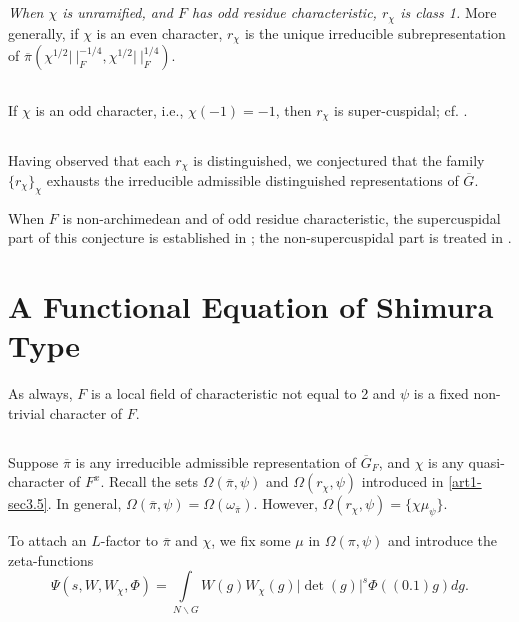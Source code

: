 \subsection{}\label{art1-sec4.3}
{\em When $\chi$ is unramified, and $F$ has odd residue characteristic, $r_{\chi}$ is class 1.} More generally, if $\chi$ is an even character, $r_{\chi}$ is the unique irreducible subrepresentation of $\overline{\pi}(\chi^{1/2}|~|^{-1/4}_{F},\chi^{1/2}|~|_{F}^{1/4})$.

\subsection{}\label{art1-sec4.4}\pageoriginale
If $\chi$ is an odd character, i.e., $\chi(-1)=-1$, then $r_{\chi}$ is super-cuspidal; cf. \cite{Ge}.

\subsection{}\label{art1-sec4.5}
Having observed that each $r_{\chi}$ is distinguished, we conjectured that the family $\{r_{\chi}\}_{\chi}$ exhausts the irreducible admissible distinguished representations of $\overline{G}$.

When $F$ is non-archimedean and of odd residue characteristic, the supercuspidal part of this conjecture is established in \cite{Meister}; the non-supercuspidal part is treated in \cite{GePS2}.

\section{A Functional Equation of Shimura Type}\label{art1-sec5}

As always, $F$ is a local field of characteristic not equal to 2 and $\psi$ is a fixed non-trivial character of $F$.

\subsection{}\label{art1-sec5.1}
Suppose $\overline{\pi}$ is any irreducible admissible representation of $\overline{G}_{F}$, and $\chi$ is any quasi-character of $F^{x}$. Recall the sets $\Omega(\overline{\pi},\psi)$ and $\Omega(r_{\chi},\psi)$ introduced in \eqref{art1-sec3.5}. In general, $\Omega(\overline{\pi},\psi)=\Omega(\omega_{\overline{\pi}})$. However, $\Omega(r_{\chi},\psi)=\{\chi \mu_{\psi}\}$.

To attach an $L$-factor to $\overline{\pi}$ and $\chi$, we fix some $\mu$ in $\Omega(\pi,\psi)$ and introduce the zeta-functions
\setcounter{equation}{0}
\begin{equation}
\Psi (s,W,W_{\chi},\Phi)=\int\limits_{N\backslash G} W(g)W_{\chi}(g)|\det (g)|^{s}\Phi((0.1)g)dg.\label{art1-eq5.1.1}
\end{equation}

